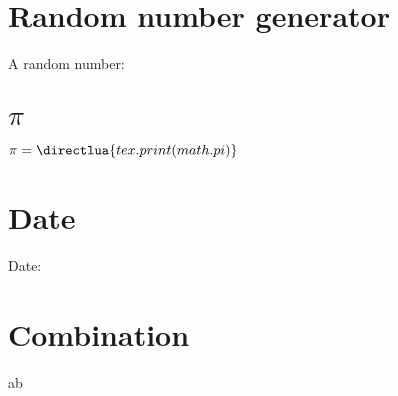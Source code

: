 \documentclass{article}
\begin{document}
\section*{Random number generator}

A random number:

\section*{$\pi$}

$\pi = \directlua{tex.print(math.pi)}$

\section*{Date}

Date:

\section*{Combination}

ab
\end{document}
